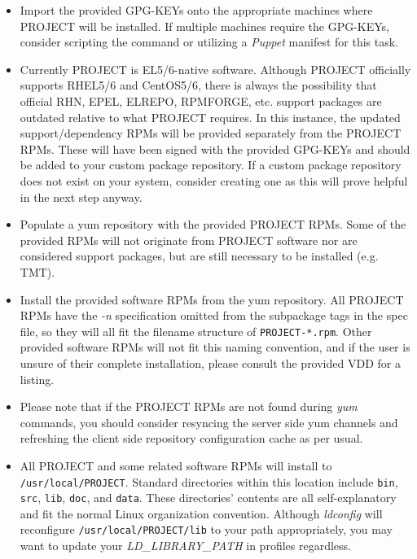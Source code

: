\documentclass[12pt,letterpaper]{article}
\begin{document}
\begin{itemize}
\item Import the provided GPG-KEYs onto the appropriate machines where PROJECT will be installed.  If multiple machines require the GPG-KEYs, consider scripting the command or utilizing a \emph{Puppet} manifest for this task.
\item Currently PROJECT is EL5/6-native software. Although PROJECT officially supports RHEL5/6 and CentOS5/6, there is always the possibility that official RHN, EPEL, ELREPO, RPMFORGE, etc. support packages are outdated relative to what PROJECT requires.  In this instance, the updated support/dependency RPMs will be provided separately from the PROJECT RPMs.  These will have been signed with the provided GPG-KEYs and should be added to your custom package repository.  If a custom package repository does not exist on your system, consider creating one as this will prove helpful in the next step anyway.
\item Populate a yum repository with the provided PROJECT RPMs.  Some of the provided RPMs will not originate from PROJECT software nor are considered support packages, but are still necessary to be installed (e.g. TMT).
\item Install the provided software RPMs from the yum repository.  All PROJECT RPMs have the \emph{-n} specification omitted from the subpackage tags in the spec file, so they will all fit the filename structure of \verb|PROJECT-*.rpm|.  Other provided software RPMs will not fit this naming convention, and if the user is unsure of their complete installation, please consult the provided VDD for a listing.
\item Please note that if the PROJECT RPMs are not found during \emph{yum} commands, you should consider resyncing the server side yum channels and refreshing the client side repository configuration cache as per usual.
\item All PROJECT and some related software RPMs will install to \linebreak\verb|/usr/local/PROJECT|.  Standard directories within this location include \verb|bin|, \verb|src|, \verb|lib|, \verb|doc|, and \verb|data|.  These directories' contents are all self-explanatory and fit the normal Linux organization convention.  Although \emph{ldconfig} will reconfigure \verb|/usr/local/PROJECT/lib| to your path appropriately, you may want to update your \emph{LD\_LIBRARY\_PATH} in profiles regardless.
\end{itemize}
\end{document}
